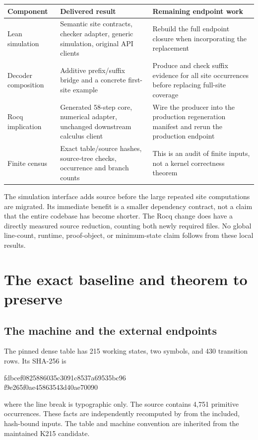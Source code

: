 \documentclass[11pt,letterpaper]{article}
\theoremstyle{definition}\newtheorem{definition}[theorem]{Definition}
\theoremstyle{remark}\newtheorem{remark}[theorem]{Remark}
\newcommand{\code}[1]{\texttt{\detokenize{#1}}}
\begin{document}
\begin{tabularx}{\textwidth}{@{}p{}YY@{}}
\toprule
Component & Delivered result & Remaining endpoint work\\
\midrule
Lean simulation & Semantic site contracts, checker adapter, generic simulation, original API clients & Rebuild the full endpoint closure when incorporating the replacement\\
Decoder composition & Additive prefix/suffix bridge and a concrete first-site example & Produce and check suffix evidence for all site occurrences before replacing full-site coverage\\
Rocq implication & Generated 58-step core, numerical adapter, unchanged downstream calculus client & Wire the producer into the production regeneration manifest and rerun the production endpoint\\
Finite census & Exact table/source hashes, source-tree checks, occurrence and branch counts & This is an audit of finite inputs, not a kernel correctness theorem\\
\bottomrule
\end{tabularx}

The simulation interface adds source before the large repeated site computations are migrated. Its immediate benefit is a smaller dependency contract, not a claim that the entire codebase has become shorter. The Rocq change does have a directly measured source reduction, counting both newly required files. No global line-count, runtime, proof-object, or minimum-state claim follows from these local results.

\section{The exact baseline and theorem to preserve}

\subsection{The machine and the external endpoints}

The pinned dense table has 215 working states, two symbols, and 430 transition rows. Its SHA-256 is
\begin{center}\small\ttfamily
fdbcef0825886035c3091c8537a69535bc96\\
f9e265f0ae45863543d40ae70090
\end{center}
where the line break is typographic only. The source contains 4,751 primitive occurrences. These facts are independently recomputed by \code{audit_snapshot.py} from the included, hash-bound inputs. The table and machine convention are inherited from the maintained K215 candidate.\cite{candidate}
\end{document}
